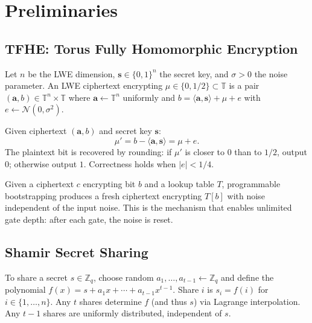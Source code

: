 \section{Preliminaries}

\label{sec:prelim}

\subsection{TFHE: Torus Fully Homomorphic Encryption}

\begin{definition}
Let $n$ be the LWE dimension, $\mathbf{s} \in \{0,1\}^n$ the secret key,
and $\sigma > 0$ the noise parameter.  An LWE ciphertext encrypting
$\mu \in \{0, 1/2\} \subset \mathbb{T}$ is a pair
$(\mathbf{a}, b) \in \mathbb{T}^n \times \mathbb{T}$ where
$\mathbf{a} \leftarrow \mathbb{T}^n$ uniformly and
$b = \langle \mathbf{a}, \mathbf{s} \rangle + \mu + e$
with $e \leftarrow \mathcal{N}(0, \sigma^2)$.
\end{definition}

\begin{definition}[Decryption]
Given ciphertext $(\mathbf{a}, b)$ and secret key $\mathbf{s}$:
\[
  \mu' = b - \langle \mathbf{a}, \mathbf{s} \rangle = \mu + e.
\]
The plaintext bit is recovered by rounding: if $\mu'$ is closer to $0$
than to $1/2$, output $0$; otherwise output $1$.  Correctness holds when
$|e| < 1/4$.
\end{definition}

\begin{definition}
Given a ciphertext $c$ encrypting bit $b$ and a lookup table $T$,
programmable bootstrapping produces a fresh ciphertext encrypting $T[b]$
with noise independent of the input noise.  This is the mechanism that
enables unlimited gate depth: after each gate, the noise is reset.
\end{definition}

\subsection{Shamir Secret Sharing}

\begin{definition}
\label{def:shamir}
To share a secret $s \in \mathbb{Z}_q$, choose random
$a_1, \ldots, a_{t-1} \leftarrow \mathbb{Z}_q$ and define the polynomial
$f(x) = s + a_1 x + \cdots + a_{t-1} x^{t-1}$.
Share $i$ is $s_i = f(i)$ for $i \in \{1, \ldots, n\}$.
Any $t$ shares determine $f$ (and thus $s$) via Lagrange interpolation.
Any $t-1$ shares are uniformly distributed, independent of $s$.
\end{definition}

